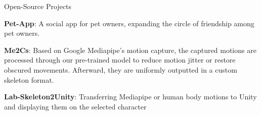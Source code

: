 
\vspace{-2mm}

\begin{cventries}

  \cventry
    {} %
    {Open-Source Projects} %
    {} %
    {} %
    {
      \vspace{-2mm}
      \begin{cvitems} %
        \item {\textbf{Pet-App}: A social app for pet owners, expanding the circle of friendship among pet owners.
        }
        \item {\textbf{Me2Cs}: Based on Google Mediapipe's motion capture, the captured motions are processed through our pre-trained model to reduce motion jitter or restore obscured movements. Afterward, they are uniformly outputted in a custom skeleton format.
        }
        \item {\textbf{Lab-Skeleton2Unity}: Transferring Mediapipe or human body motions to Unity and displaying them on the selected character
        }
      \end{cvitems}
    }
  \vspace{-2mm}

\end{cventries}